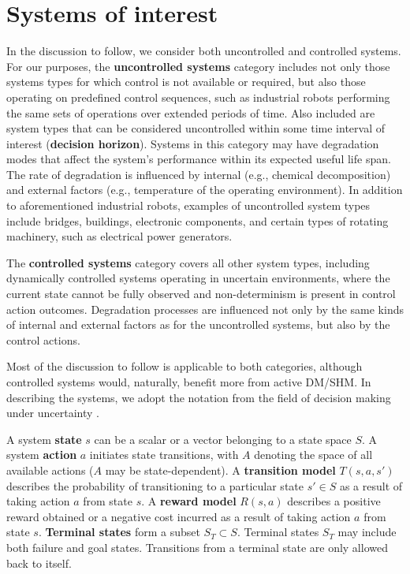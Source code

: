 \section{Systems of interest}
\label{sec:systems}

In the discussion to follow, we consider both uncontrolled and controlled systems. For our purposes, the \textbf{uncontrolled systems} category includes not only those systems types for which control is not available or required, but also those operating on predefined control sequences, such as industrial robots performing the same sets of operations over extended periods of time.  Also included are system types that can be considered uncontrolled within some time interval of interest (\textbf{decision horizon}). Systems in this category may have degradation modes that affect the system's performance within its expected useful life span. The rate of degradation is influenced by internal (e.g., chemical decomposition) and external factors (e.g., temperature of the operating environment). In addition to aforementioned industrial robots, examples of uncontrolled system types include bridges, buildings, electronic components, and certain types of rotating machinery, such as electrical power generators.

The \textbf{controlled systems} category covers all other system types, including dynamically controlled systems operating in uncertain environments, where the current state cannot be fully observed and non-determinism is present in control action outcomes. Degradation processes are influenced not only by the same kinds of internal and external factors as for the uncontrolled systems, but also by the control actions.

Most of the discussion to follow is applicable to both categories, although controlled systems would, naturally, benefit more from active DM/SHM. In describing the systems, we adopt the notation from the field of decision making under uncertainty \cite{Kaelbling1998}. 

A system \textbf{state} $s$ can be a scalar or a vector belonging to a state space $S$. A system \textbf{action} $a$ initiates state transitions, with $A$ denoting the space of all available actions ($A$ may be state-dependent). A \textbf{transition model} $T(s,a,s')$ describes the probability of transitioning to a particular state $s' \in S$ as a result of taking action $a$ from state $s$. A \textbf{reward model} $R(s,a)$ describes a positive reward obtained or a negative cost incurred as a result of taking action $a$ from state $s$. \textbf{Terminal states} form a subset $S_T \subset S$. Terminal states $S_T$ may include both failure and goal states. Transitions from a terminal state are only allowed back to itself.

